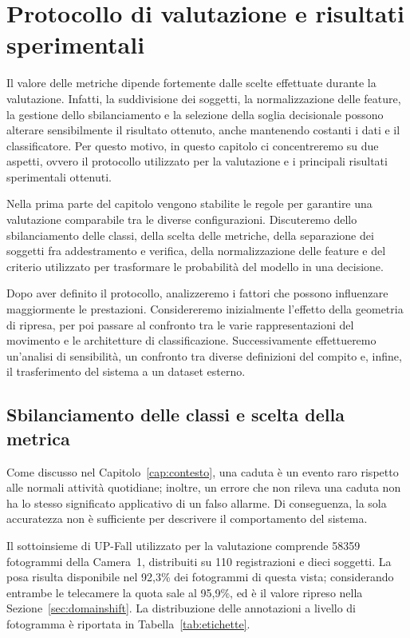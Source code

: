 \chapter{Protocollo di valutazione e risultati sperimentali}
\label{cap:risultati}
\label{cap:protocollo}
\label{cap:sperimentale}

Il valore delle metriche dipende fortemente dalle scelte effettuate durante la valutazione. Infatti, la suddivisione dei soggetti, la normalizzazione delle feature, la gestione dello sbilanciamento e la selezione della soglia decisionale possono alterare sensibilmente il risultato ottenuto, anche mantenendo costanti i dati e il classificatore.
Per questo motivo, in questo capitolo ci concentreremo su due aspetti, ovvero il protocollo utilizzato per la valutazione e i principali risultati sperimentali ottenuti.

Nella prima parte del capitolo vengono stabilite le regole per garantire una valutazione comparabile tra le diverse configurazioni. Discuteremo dello sbilanciamento delle classi, della scelta delle metriche, della separazione dei soggetti fra addestramento e verifica, della normalizzazione delle feature e del criterio utilizzato per trasformare le probabilità del modello in una decisione.

Dopo aver definito il protocollo, analizzeremo i fattori che possono influenzare maggiormente le prestazioni. Considereremo inizialmente l'effetto della geometria di ripresa, per poi passare al confronto tra le varie rappresentazioni del movimento e le architetture di classificazione. Successivamente effettueremo un'analisi di sensibilità, un confronto tra diverse definizioni del compito e, infine, il trasferimento del sistema a un dataset esterno.

\section{Sbilanciamento delle classi e scelta della metrica}

Come discusso nel Capitolo~\ref{cap:contesto}, una caduta è un evento raro rispetto alle normali attività quotidiane; inoltre, un errore che non rileva una caduta non ha lo stesso significato applicativo di un falso allarme. Di conseguenza, la sola accuratezza non è sufficiente per descrivere il comportamento del sistema.

Il sottoinsieme di UP-Fall utilizzato per la valutazione comprende \num{58359} fotogrammi della Camera~1, distribuiti su 110 registrazioni e dieci soggetti. La posa risulta disponibile nel 92,3\% dei fotogrammi di questa vista; considerando entrambe le telecamere la quota sale al 95,9\%, ed è il valore ripreso nella Sezione~\ref{sec:domainshift}. La distribuzione delle annotazioni a livello di fotogramma è riportata in Tabella~\ref{tab:etichette}.

